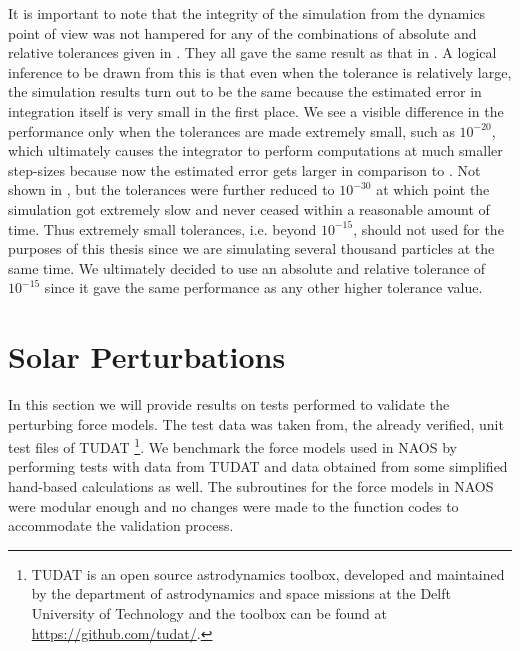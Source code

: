 \FloatBarrier
It is important to note that the integrity of the simulation from the dynamics point of view was not hampered for any of the combinations of absolute and relative tolerances given in . They all gave the same result as that in . A logical inference to be drawn from this is that even when the tolerance is relatively large, the simulation results turn out to be the same because the estimated error in integration itself is very small in the first place. We see a visible difference in the performance only when the tolerances are made extremely small, such as $10^{-20}$, which ultimately causes the integrator to perform computations at much smaller step-sizes because now the estimated error gets larger in comparison to . Not shown in , but the tolerances were further reduced to $10^{-30}$ at which point the simulation got extremely slow and never ceased within a reasonable amount of time. Thus extremely small tolerances, i.e. beyond $10^{-15}$, should not used for the purposes of this thesis since we are simulating several thousand particles at the same time. We ultimately decided to use an absolute and relative tolerance of $10^{-15}$ since it gave the same performance as any other higher tolerance value.

\section{Solar Perturbations}
\label{sec:perturbations_vv}
In this section we will provide results on tests performed to validate the perturbing force models. The test data was taken from, the already verified, unit test files of \gls{TUDAT} \footnote{\gls{TUDAT} is an open source astrodynamics toolbox, developed and maintained by the department of astrodynamics and space missions at the Delft University of Technology and the toolbox can be found at \url{https://github.com/tudat/}.}. We benchmark the force models used in \gls{NAOS} by performing tests with data from \gls{TUDAT} and data obtained from some simplified hand-based calculations as well. The subroutines for the force models in \gls{NAOS} were modular enough and no changes were made to the function codes to accommodate the validation process.

